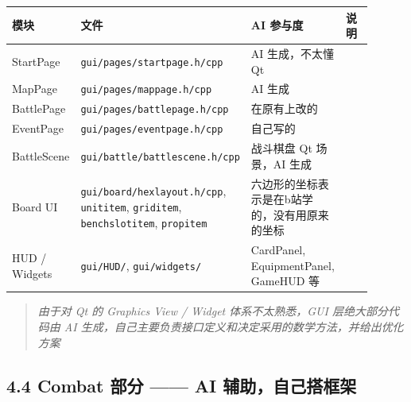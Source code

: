 \documentclass[UTF8,10pt]{ctexart}
\begin{document}
{\small
\begin{longtable}{p{0.20\linewidth}p{0.24\linewidth}p{0.18\linewidth}p{0.28\linewidth}}
\toprule
\textbf{模块} & \textbf{文件} & \textbf{AI 参与度} & \textbf{说明} \\
\midrule
StartPage & \texttt{gui/\allowbreak{}pages/\allowbreak{}startpage.\allowbreak{}h/\allowbreak{}cpp} & AI 生成，不太懂 Qt &  \\
MapPage & \texttt{gui/\allowbreak{}pages/\allowbreak{}mappage.\allowbreak{}h/\allowbreak{}cpp} & AI 生成 &  \\
BattlePage & \texttt{gui/\allowbreak{}pages/\allowbreak{}battlepage.\allowbreak{}h/\allowbreak{}cpp} & 在原有上改的 &  \\
EventPage & \texttt{gui/\allowbreak{}pages/\allowbreak{}eventpage.\allowbreak{}h/\allowbreak{}cpp} & 自己写的 &  \\
BattleScene & \texttt{gui/\allowbreak{}battle/\allowbreak{}battlescene.\allowbreak{}h/\allowbreak{}cpp} & 战斗棋盘 Qt 场景，AI 生成 &  \\
Board UI & \texttt{gui/\allowbreak{}board/\allowbreak{}hexlayout.\allowbreak{}h/\allowbreak{}cpp}, \texttt{unititem}, \texttt{griditem}, \texttt{benchslotitem}, \texttt{propitem} & 六边形的坐标表示是在b站学的，没有用原来的坐标 &  \\
HUD / Widgets & \texttt{gui/\allowbreak{}HUD/\allowbreak{}}, \texttt{gui/\allowbreak{}widgets/\allowbreak{}} & CardPanel, EquipmentPanel, GameHUD 等 &  \\
\bottomrule
\end{longtable}
}

\begin{quote}\itshape 由于对 Qt 的 Graphics View / Widget 体系不太熟悉，GUI 层绝大部分代码由 AI 生成，自己主要负责接口定义和决定采用的数学方法，并给出优化方案\end{quote}

\subsection*{4.4 Combat 部分 —— AI 辅助，自己搭框架}
\end{document}
